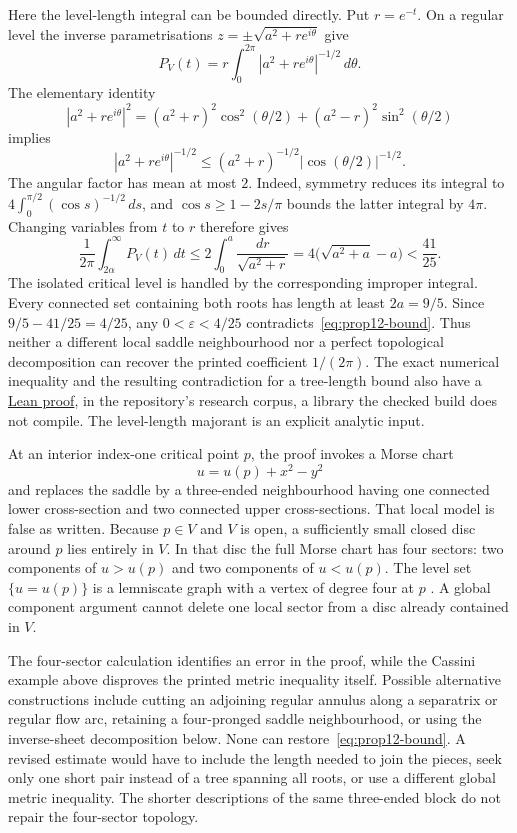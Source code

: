 \documentclass[11pt]{article}
\begin{document}
Here the level-length integral can be bounded directly. Put $r=e^{-t}$.
On a regular level the inverse parametrisations
$z=\pm\sqrt{a^2+re^{i\theta}}$ give
\[
 P_V(t)=r\int_0^{2\pi}|a^2+re^{i\theta}|^{-1/2}\,d\theta.
\]
The elementary identity
\[
 |a^2+re^{i\theta}|^2
 =(a^2+r)^2\cos^2(\theta/2)+(a^2-r)^2\sin^2(\theta/2)
\]
implies
\[
 |a^2+re^{i\theta}|^{-1/2}
 \le(a^2+r)^{-1/2}|\cos(\theta/2)|^{-1/2}.
\]
The angular factor has mean at most $2$. Indeed, symmetry reduces its
integral to $4\int_0^{\pi/2}(\cos s)^{-1/2}\,ds$, and
$\cos s\ge1-2s/\pi$ bounds the latter integral by $4\pi$.
Changing variables from $t$ to $r$ therefore gives
\[
 \frac1{2\pi}\int_{2\alpha}^{\infty}P_V(t)\,dt
 \le2\int_0^a\frac{dr}{\sqrt{a^2+r}}
 =4\bigl(\sqrt{a^2+a}-a\bigr)<\frac{41}{25}.
\]
The isolated critical level is handled by the corresponding improper
integral. Every connected set containing both roots has length at least
$2a=9/5$. Since $9/5-41/25=4/25$, any
$0<\varepsilon<4/25$ contradicts~\eqref{eq:prop12-bound}.  Thus neither a different local saddle neighbourhood nor a perfect
topological decomposition can recover the printed coefficient $1/(2\pi)$.
The exact numerical inequality and the resulting contradiction for a
tree-length bound also have a \href{https://github.com/wcook04/plectis-erdos/blob/e6c2d8f77ac24753c5216a49f4daf7f7388b309f/research_corpus/Erdos1041/CassiniTreeBudget.lean\#L117}{Lean proof}, in the repository's
research corpus, a library the checked build does not compile. The
level-length majorant is an explicit analytic input.

At an interior index-one critical point $p$, the proof invokes a Morse chart
\[
 u=u(p)+x^2-y^2
\]
and replaces the saddle by a three-ended neighbourhood having one connected
lower cross-section and two connected upper cross-sections.  That local model
is false as written.  Because $p\in V$ and $V$ is open, a sufficiently small
closed disc around $p$ lies entirely in $V$.  In that disc the full Morse chart
has four sectors: two components of $u>u(p)$ and two components of $u<u(p)$.
The level set $\{u=u(p)\}$ is a lemniscate graph with a vertex of degree four
at $p$ \cite[Definition~1.2 and Proposition~2.4]{bishoperemenkolazebnik2025}.
A global component argument cannot delete one local sector from a disc already
contained in $V$.

The four-sector calculation identifies an error in the proof, while the
Cassini example above disproves the printed metric inequality itself.
Possible alternative constructions include cutting an adjoining regular
annulus along a separatrix or regular flow arc, retaining a four-pronged
saddle neighbourhood, or using the inverse-sheet decomposition below.
None can restore~\eqref{eq:prop12-bound}. A revised estimate would have
to include the length needed to join the pieces, seek only one short
pair instead of a tree spanning all roots, or use a different global
metric inequality.
The shorter descriptions of the same three-ended block do not repair the
four-sector topology.
\end{document}
